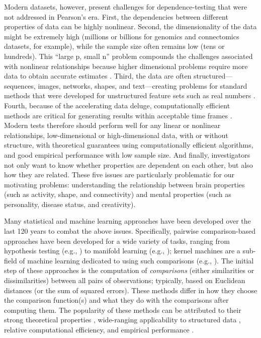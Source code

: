 \documentclass[11pt]{article}
\begin{document}
Modern datasets, however, present  challenges for dependence-testing that were not addressed in Pearson's era.
%
First, the dependencies between different properties 
of data can be highly {nonlinear}.
% 
Second, the dimensionality of the data might be extremely high (millions or billions for genomics and connectomics datasets, for example), while the sample size often remains low (tens or hundreds).  This ``{large p, small n}'' problem compounds the challenges associated with nonlinear relationships because higher dimensional problems require more data to obtain accurate estimates \cite{johnstone2009statistical}.
Third, the data are often {structured}---sequences, images, networks, shapes, and text---creating problems for standard methods that were developed for unstructured feature sets such as real numbers \cite{bakir2007predicting}.
Fourth, because of the accelerating data deluge,  {computationally efficient} methods are critical for generating results within acceptable time frames \cite{hey2009fourth}.
Modern tests therefore should perform well for any linear or nonlinear relationships, low-dimensional or high-dimensional data, with or without structure, with theoretical guarantees using computationally efficient algorithms, and good empirical performance with low sample size.
And finally, investigators not only want to know {whether}  properties are dependent on each other, but also {how they are related.}
These five issues are particularly problematic for our motivating problems: understanding the relationship between brain properties (such as activity, shape, and connectivity) and mental properties (such as personality, disease status, and creativity).



Many statistical and machine learning approaches have been developed over the last 120 years to combat the above issues. Specifically, pairwise comparison-based approaches have been developed for  a wide variety of tasks,  ranging from hypothesis testing (e.g., \cite{David1966,Mantel1967,Friedman1983,Schilling1986,Maa1996,SzekelyRizzo2009,SzekelyRizzo2013b,HellerGorfine2013,Dumcke2014}) 
to manifold learning (e.g., \cite{TorgersonBook, TenenbaumSilvaLangford2000, SaulRoweis2000, BelkinNiyogi2003,DiffusionPNAS, MMS:NoisyDictionaryLearning}); kernel machines are a sub-field of machine learning dedicated to using such comparisons (e.g., \cite{scholkopf2002learning,GrettonEtAl2005,harchaoui2013kernel}).
The initial step of these approaches is the computation of \emph{comparisons} (either  similarities or dissimilarities) between all pairs of observations; typically, based on Euclidean distances (or the sum of squared errors).
These methods differ in how they choose the comparison function(s) and what they do with the comparisons after computing them. 
The popularity of these methods can be attributed to their strong theoretical properties \cite{SilvaTenenbaum2002,Allard2012}, wide-ranging applicability to structured data \cite{scholkopf2002learning}, relative computational efficiency, and empirical performance \cite{lu2014scale}. 
\end{document}

